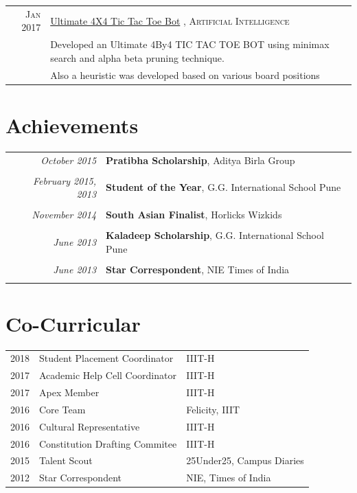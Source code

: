 \documentclass[a4paper,10pt]{article}
\begin{document}
\begin{tabular}{rl}
\textsc{Jan} 2017 & \href{https://github.com/devanshmanu/Ultimate-4x4-Tic-Tac-Toe}{Ultimate 4X4 Tic Tac Toe Bot} , \textsc{Artificial Intelligence}\\
& \footnotesize{Developed an Ultimate 4By4 TIC TAC TOE BOT using minimax search and alpha beta pruning technique.}\\
& \footnotesize{Also a heuristic was developed based on various board positions }\\



\end{tabular}


\section{Achievements}
\begin{tabular}{r|p{11cm}}


 \emph{October 2015} & \textbf{Pratibha Scholarship}, Aditya Birla Group\\\multicolumn{2}{c}{} \\
 
  \emph{February 2015, 2013} & \textbf{Student of the Year}, G.G. International School Pune\\\multicolumn{2}{c}{} \\
 

 \emph{November 2014} & \textbf{South Asian Finalist}, Horlicks Wizkids\\\multicolumn{2}{c}{} \\
 
 \emph{June 2013} & \textbf{Kaladeep Scholarship}, G.G. International School Pune\\\multicolumn{2}{c}{} \\
 
 
 \emph{June 2013} &\textbf{ Star Correspondent}, NIE Times of India\\\multicolumn{2}{c}{} \\
 

\end{tabular}






\section{Co-Curricular}


 \begin{tabular}{rll}
2018 	&Student Placement Coordinator    &IIIT-H\\
2017 	&Academic Help Cell Coordinator    &IIIT-H\\
2017 	&Apex Member    &IIIT-H\\
2016    &Core Team  &Felicity, IIIT \\
2016    &Cultural Representative   &IIIT-H\\
2016   &Constitution Drafting Commitee  &IIIT-H\\
2015   &Talent Scout   &25Under25, Campus Diaries\\
2012   &Star Correspondent   &NIE, Times of India\\
\end{tabular}
 
\end{document}
